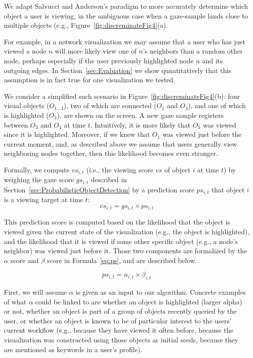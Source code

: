 We adapt Salvucci and Anderson's paradigm to more accurately determine which object a user is viewing, in the ambiguous case when a gaze-sample lands close to multiple objects (e.g.,  Figure~\ref{fig:discreminateFig4}(a).  

For example, in a network visualization we may assume that a user who has just viewed a node $n$ will more likely view one of $n$'s neighbors than a random other node, perhaps especially if the user previously highlighted node $n$ and its outgoing edges.  In Section~\ref{sec:Evaluation} we show qunatitatively that this assumption is in fact true for one visualization we tested.  

We consider a simplified such scenario in Figure~\ref{fig:discreminateFig4}(b): four visual objects ($O_{1\ldots 4}$), two of which are connected ($O_1$ and $O_3$), and one of which is highlighted ($O_3$), are shown on the screen. A new gaze sample registers between $O_3$ and $O_4$ at time $t$. Intuitively, it is more likely that $O_3$ was viewed since it is highlighted. Moreover, if we knew that $O_1$ was viewed just before the current moment, and, as described above we assume that users generally view neighboring nodes together, then this likelihood becomes even stronger.         
 
Formally, we compute $vs_{i,t}$  (i.e., the viewing score $vs$ of object $i$ at time $t$) by weighing the gaze score $gs_{i,t}$ described in Section~\ref{sec:ProbabilisticObjectDetection} by a prediction score $ps_{i,t}$ that object $i$ is a viewing target at time $t$:  
\begin{equation}
vs_{i,t} = gs_{i,t} \times ps_{i,t}
\label{eq:VS}
\end{equation}

This prediction score is computed based on the likelihood that the object is viewed given the current state of the visualization (e.g., the object is highlighted), and the likelihood that it is viewed if some other specific object (e.g.,  a node's neighbor) was viewed just before it. Those two components are formalized by the  $\alpha$ score and $\beta$ score in Formula~\ref{eq:ps}, and are described below. 

\begin{equation}
ps_{i,t} = \alpha_{i,t} \times \beta_{i,t}
\label{eq:ps}
\end{equation}

First, we will assume $\alpha$ is given as an input to our algorithm. Concrete examples of what $\alpha$ could be linked to are whether an object is highlighted (larger alpha) or not, whether an object is part of a group of objects recently queried by the user, or whether an object is known to be of particular interest to the users' current workflow (e.g., because they have viewed it often before, because the visualization was constructed using those objects as initial seeds, because they are mentioned as keywords in a user's profile). 

